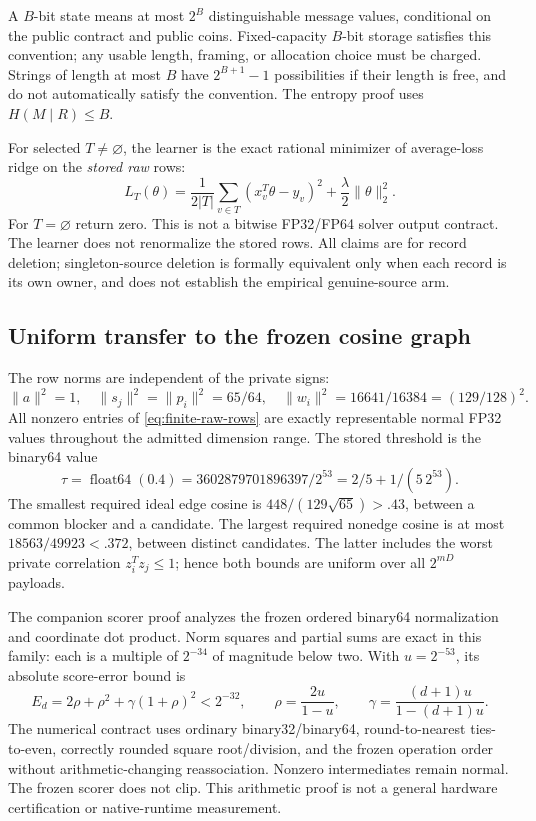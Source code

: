 A $B$-bit state means at most $2^B$ distinguishable message values,
conditional on the public contract and public coins.  Fixed-capacity
$B$-bit storage satisfies this convention; any usable length, framing, or
allocation choice must be charged.  Strings of length at most $B$ have
$2^{B+1}-1$ possibilities if their length is free, and do not automatically
satisfy the convention.  The entropy proof uses $H(M\mid R)\le B$.

For selected $T\ne\varnothing$, the learner is the exact rational minimizer
of average-loss ridge on the \emph{stored raw} rows:
\[
 L_T(\theta)=\frac1{2|T|}\sum_{v\in T}(x_v^T\theta-y_v)^2
                          +\frac\lambda2\|\theta\|_2^2.
\]
For $T=\varnothing$ return zero.  This is not a bitwise FP32/FP64 solver
output contract.  The learner does not renormalize the stored rows.  All
claims are for record deletion; singleton-source deletion is formally
equivalent only when each record is its own owner, and does not establish
the empirical genuine-source arm.

\subsection{Uniform transfer to the frozen cosine graph}
The row norms are independent of the private signs:
\[
 \|a\|^2=1,\quad\|s_j\|^2=\|p_i\|^2=65/64,\quad
 \|w_i\|^2=16641/16384=(129/128)^2.
\]
All nonzero entries of \eqref{eq:finite-raw-rows} are exactly representable
normal FP32 values throughout the admitted dimension range.  The stored
threshold is the binary64 value
\[
 \tau=\operatorname{float64}(0.4)=3602879701896397/2^{53}
                                =2/5+1/(5\,2^{53}).
\]
The smallest required ideal edge cosine is
$448/(129\sqrt{65})>.43$, between a common blocker and a candidate.
The largest required nonedge cosine is at most
$18563/49923<.372$, between distinct candidates.  The latter includes the
worst private correlation $z_i^Tz_j\le1$; hence both bounds are uniform
over all $2^{mD}$ payloads.

The companion scorer proof analyzes the frozen ordered binary64
normalization and coordinate dot product.  Norm squares and partial sums
are exact in this family: each is a multiple of $2^{-34}$ of magnitude
below two.  With $u=2^{-53}$, its absolute score-error bound is
\[
 E_d=2\rho+\rho^2+\gamma(1+\rho)^2<2^{-32},\qquad
 \rho=\frac{2u}{1-u},\qquad
 \gamma=\frac{(d+1)u}{1-(d+1)u}.
\]
The numerical contract uses ordinary binary32/binary64, round-to-nearest
ties-to-even, correctly rounded square root/division, and the frozen
operation order without arithmetic-changing reassociation.  Nonzero
intermediates remain normal.  The frozen scorer does not clip.  This
arithmetic proof is not a general hardware certification or native-runtime
measurement.

